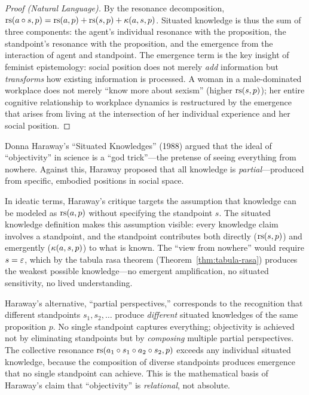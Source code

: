 \begin{proof}[Proof (Natural Language)]
By the resonance decomposition, $\mathrm{rs}(a \circ s, p) = \mathrm{rs}(a, p) + \mathrm{rs}(s, p) +
\kappa(a, s, p)$. Situated knowledge is thus the sum of three components: the
agent's individual resonance with the proposition, the standpoint's resonance
with the proposition, and the emergence from the interaction of agent and
standpoint. The emergence term is the key insight of feminist epistemology: social
position does not merely \emph{add} information but \emph{transforms} how
existing information is processed. A woman in a male-dominated workplace does not
merely ``know more about sexism'' (higher $\mathrm{rs}(s, p)$); her entire cognitive
relationship to workplace dynamics is restructured by the emergence that arises
from living at the intersection of her individual experience and her social position.
\end{proof}

\begin{interpretation}
Donna Haraway's ``Situated Knowledges'' (1988) argued that the ideal of ``objectivity''
in science is a ``god trick''---the pretense of seeing everything from nowhere.
Against this, Haraway proposed that all knowledge is \emph{partial}---produced from
specific, embodied positions in social space.

In ideatic terms, Haraway's critique targets the assumption that knowledge can be
modeled as $\mathrm{rs}(a, p)$ without specifying the standpoint $s$. The situated
knowledge definition makes this assumption visible: every knowledge claim involves
a standpoint, and the standpoint contributes both directly ($\mathrm{rs}(s, p)$) and
emergently ($\kappa(a, s, p)$) to what is known. The ``view from nowhere'' would
require $s = \varepsilon$, which by the tabula rasa theorem
(Theorem~\ref{thm:tabula-rasa}) produces the weakest possible knowledge---no
emergent amplification, no situated sensitivity, no lived understanding.

Haraway's alternative, ``partial perspectives,'' corresponds to the recognition
that different standpoints $s_1, s_2, \ldots$ produce \emph{different} situated
knowledges of the same proposition $p$. No single standpoint captures everything;
objectivity is achieved not by eliminating standpoints but by \emph{composing}
multiple partial perspectives. The collective resonance
$\mathrm{rs}(a_1 \circ s_1 \circ a_2 \circ s_2, p)$ exceeds any individual
situated knowledge, because the composition of diverse standpoints produces
emergence that no single standpoint can achieve. This is the mathematical basis
of Haraway's claim that ``objectivity'' is \emph{relational}, not absolute.
\end{interpretation}

